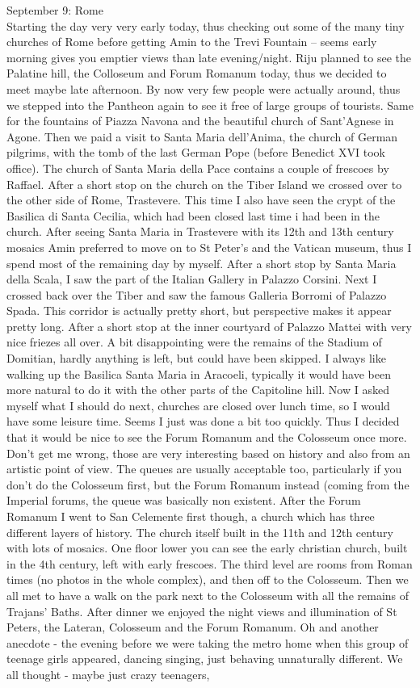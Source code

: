 September 9: Rome\\
Starting the day very very early today, thus checking out some of the many tiny churches of Rome before getting Amin to the Trevi Fountain -- seems early morning gives you emptier views than late evening/night. Riju planned to see the Palatine hill, the Colloseum and Forum Romanum today, thus we decided to meet maybe late afternoon. By now very few people were actually around, thus we stepped into the Pantheon again to see it free of large groups of tourists. Same for the fountains of Piazza Navona and the beautiful church of Sant'Agnese in Agone. Then we paid a visit to Santa Maria dell'Anima, the church of German pilgrims, with the tomb of the last German Pope (before Benedict XVI took office). The church of Santa Maria della Pace contains a couple of frescoes by Raffael. After a short stop on the church on the Tiber Island we crossed over to the other side of Rome, Trastevere. This time I also have seen the crypt of the Basilica di Santa Cecilia, which had been closed last time i had been in the church. After seeing Santa Maria in Trastevere with its 12th and 13th century mosaics Amin preferred to move on to St Peter's and the Vatican museum, thus I spend most of the remaining day by myself. After a short stop by Santa Maria della Scala, I saw the part of the Italian Gallery in Palazzo Corsini. Next I crossed back over the Tiber and saw the famous Galleria Borromi of Palazzo Spada. This corridor is actually pretty short, but perspective makes it appear pretty long. After a short stop at the inner courtyard of Palazzo Mattei with very nice friezes all over. A bit disappointing were the remains of the Stadium of Domitian, hardly anything is left, but could have been skipped. I always like walking up the Basilica Santa Maria in Aracoeli, typically it would have been more natural to do it with the other parts of the Capitoline hill. Now I asked myself what I should do next, churches are closed over lunch time, so I would have some leisure time. Seems I just was done a bit too quickly. Thus I decided that it would be nice to see the Forum Romanum and the Colosseum once more. Don't get me wrong, those are very interesting based on history and also from an artistic point of view. The queues are usually acceptable too, particularly if you don't do the Colosseum first, but the Forum Romanum instead (coming from the Imperial forums, the queue was basically non existent. After the Forum Romanum I went to San Celemente first though, a church which has three different layers of history. The church itself built in the 11th and 12th century with lots of mosaics. One floor lower you can see the early christian church, built in the 4th century, left with early frescoes. The third level are rooms from Roman times (no photos in the whole complex), and then off to the Colosseum. Then we all met to have a walk on the park next to the Colosseum with all the remains of Trajans' Baths. After dinner we enjoyed the night views and illumination of St Peters, the Lateran, Colosseum and the Forum Romanum. Oh and another anecdote - the evening before we were taking the metro home when this group of teenage girls appeared, dancing singing, just behaving unnaturally different. We all thought - maybe just crazy teenagers, 